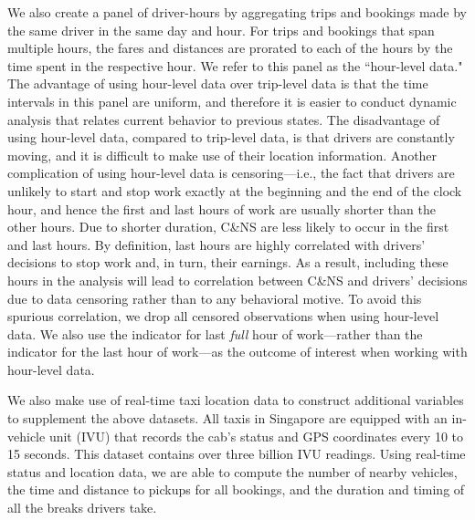 \documentclass[reviewmode]{restat}
\begin{document}


We also create a panel of driver-hours by aggregating trips and bookings made by the same driver in the same 
day and hour. For trips and bookings that span multiple hours, the fares and distances are prorated to each
of the hours by the time spent in the respective hour. We refer to this panel as the ``hour-level data."
The advantage of using hour-level data over trip-level data is that the time intervals in this panel are uniform, 
and therefore it is easier to conduct dynamic analysis that relates current behavior to previous states. 
The disadvantage of using hour-level data, compared to trip-level data, is that drivers are constantly moving,
and it is difficult to make use of their location information. Another complication of using hour-level data
is censoring---i.e., the fact that drivers are unlikely to start and stop work exactly at the beginning and
the end of the clock hour, and hence the first and last hours of work are usually shorter than the other hours.
Due to shorter duration, C\&NS are less likely to occur in the first and last hours. By definition, last hours
are highly correlated with drivers' decisions to stop work and, in turn, their earnings. As a result, 
including these hours in the analysis will lead to correlation between C\&NS and drivers' decisions due to
data censoring rather than to any behavioral motive. To avoid this spurious correlation, we drop all censored
observations when using hour-level data. We also use the indicator for last \emph{full} hour of work---rather 
than the indicator for the last hour of work---as the outcome of interest when working with hour-level data.

We also make use of real-time taxi location data to construct additional variables to supplement the above datasets.
All taxis in Singapore are equipped with an in-vehicle unit (IVU) that records the cab's status and GPS 
coordinates every 10 to 15 seconds. This dataset contains over three billion IVU readings. Using real-time
status and location data, we are able to compute the number of nearby vehicles, the time and distance 
to pickups for all bookings, and the duration and timing of all the breaks drivers take.
\end{document}
